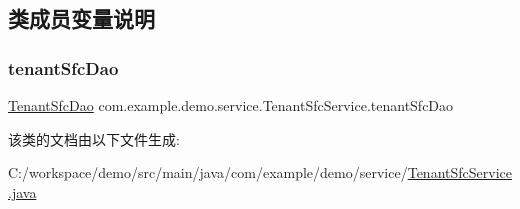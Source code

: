\subsection{类成员变量说明}
\mbox{\label{classcom_1_1example_1_1demo_1_1service_1_1_tenant_sfc_service_a77017e1d7336b08e1d868493c7e6bee0}} 
\subsubsection{\texorpdfstring{tenant\+Sfc\+Dao}{tenantSfcDao}}
{\footnotesize\ttfamily \mbox{\hyperlink{interfacecom_1_1example_1_1demo_1_1dao_1_1_tenant_sfc_dao}{Tenant\+Sfc\+Dao}} com.\+example.\+demo.\+service.\+Tenant\+Sfc\+Service.\+tenant\+Sfc\+Dao\hspace{0.3cm}{\ttfamily [package]}}



该类的文档由以下文件生成\+:\begin{DoxyCompactItemize}
\item 
C\+:/workspace/demo/src/main/java/com/example/demo/service/\mbox{\hyperlink{_tenant_sfc_service_8java}{Tenant\+Sfc\+Service.\+java}}\end{DoxyCompactItemize}
